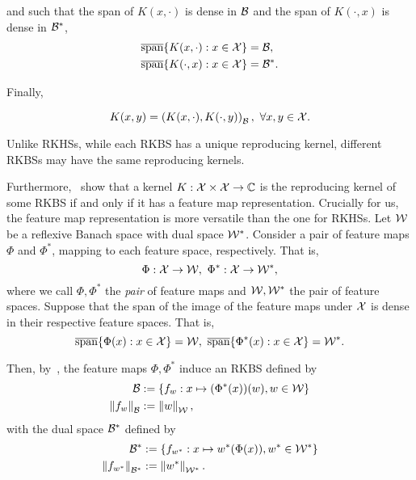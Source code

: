and such that the span of $K(x, \cdot)$ is dense in ${\mathcal{B}}$ and the span of $K(\cdot, x)$ is dense in ${\mathcal{B}}^*$,
\begin{align}
    \overline{\text{span}}\{K(x, \cdot): x \in {\mathcal{X}}\} &= {\mathcal{B}}, \\
    \overline{\text{span}}\{K(\cdot, x): x \in {\mathcal{X}}\} &= {\mathcal{B}}^*.
\end{align}

Finally,

\begin{equation}
    K(x, y) = \left(K(x, \cdot), K(\cdot, y)\right)_{\mathcal{B}}, \ \forall x, y \in {\mathcal{X}}.
\end{equation}

Unlike RKHSs, while each RKBS has a unique reproducing kernel, different RKBSs may have the same reproducing kernels.

Furthermore,~\parencite[Theorems 3 and 4]{zhangReproducingKernel2009} show that a kernel $K: {\mathcal{X}} \times {\mathcal{X}} \to {\mathbb{C}}$ is the reproducing kernel of some RKBS if and only if it has a feature map representation. Crucially for us, the feature map representation is more versatile than the one for RKHSs. Let ${\mathcal{W}}$ be a reflexive Banach space with dual space ${\mathcal{W}}^*$. Consider a pair of feature maps $\Phi$ and $\Phi^*$, mapping to each feature space, respectively. That is,
\begin{equation*}
    \Phi: {\mathcal{X}} \to {\mathcal{W}}, \ \Phi^*: {\mathcal{X}} \to {\mathcal{W}}^*,
\end{equation*}
where we call $\Phi, \Phi^*$ the \textit{pair} of feature maps and ${\mathcal{W}}, {\mathcal{W}}^*$ the pair of feature spaces. Suppose that the span of the image of the feature maps under ${\mathcal{X}}$ is dense in their respective feature spaces. That is,
\begin{equation}
    \overline{\text{span}}\{\Phi(x): x \in {\mathcal{X}}\} = {\mathcal{W}}, \ \overline{\text{span}}\{\Phi^*(x): x \in {\mathcal{X}}\} = {\mathcal{W}}^*.
\end{equation}

Then, by~\parencite[Theorem 3]{zhangReproducingKernel2009}, the feature maps $\Phi, \Phi^*$ induce an RKBS defined by
\begin{align}
    {\mathcal{B}} &:= \left\{f_w: x \mapsto (\Phi^*(x))(w), w \in {\mathcal{W}}\right\} \\
    \left\lVert f_w\right\rVert_{\mathcal{B}} &:= \left\lVert w\right\rVert_{\mathcal{W}},
\end{align}
with the dual space ${\mathcal{B}}^*$ defined by
\begin{align}
    {\mathcal{B}}^* &:= \left\{f_{w^*}: x \mapsto w^*(\Phi(x)), w^* \in {\mathcal{W}}^*\right\} \\
    \left\lVert f_{w^*}\right\rVert_{{\mathcal{B}}^*} &:= \left\lVert w^*\right\rVert_{{\mathcal{W}}^*}.
\end{align}

